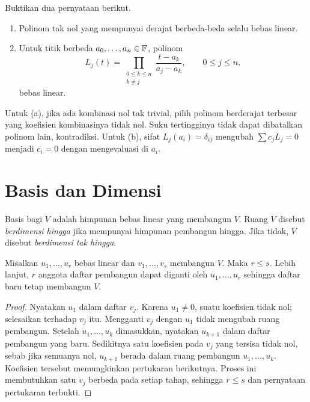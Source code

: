 \begin{exam}
    Buktikan dua pernyataan berikut.
    \begin{enumerate}[label=(\alph*),nosep]
        \item Polinom tak nol yang mempunyai derajat berbeda-beda
        selalu bebas linear.
        \item Untuk titik berbeda $a_0,\ldots,a_n\in\mathbb{F}$, polinom
        \[
            L_j(t)=\prod_{\substack{0\le k\le n\\k\ne j}}
                \frac{t-a_k}{a_j-a_k},\qquad 0\le j\le n,
        \]
        bebas linear.
    \end{enumerate}
\end{exam}
\begin{solution}
    Untuk (a), jika ada kombinasi nol tak trivial, pilih polinom
    berderajat terbesar yang koefisien kombinasinya tidak nol.
    Suku tertingginya tidak dapat dibatalkan polinom lain, kontradiksi.
    Untuk (b), sifat $L_j(a_i)=\delta_{ij}$ mengubah
    $\sum c_jL_j=0$ menjadi $c_i=0$ dengan mengevaluasi di $a_i$.
\end{solution}

\section{Basis dan Dimensi}

\begin{definisi}
    Basis bagi $V$ adalah himpunan bebas linear yang membangun $V$.
    Ruang $V$ disebut \emph{berdimensi hingga} jika mempunyai
    himpunan pembangun hingga. Jika tidak, $V$ disebut
    \emph{berdimensi tak hingga}.
\end{definisi}

\begin{teorema}
    Misalkan $u_1,\ldots,u_r$ bebas linear dan
    $v_1,\ldots,v_s$ membangun $V$. Maka $r\le s$.
    Lebih lanjut, $r$ anggota daftar pembangun dapat diganti
    oleh $u_1,\ldots,u_r$ sehingga daftar baru tetap membangun $V$.
\end{teorema}
\begin{proof}
    Nyatakan $u_1$ dalam daftar $v_j$. Karena $u_1\ne0$, suatu
    koefisien tidak nol; selesaikan terhadap $v_j$ itu. Mengganti
    $v_j$ dengan $u_1$ tidak mengubah ruang pembangun.
    Setelah $u_1,\ldots,u_k$ dimasukkan, nyatakan $u_{k+1}$
    dalam daftar pembangun yang baru. Sedikitnya satu koefisien
    pada $v_j$ yang tersisa tidak nol, sebab jika semuanya nol,
    $u_{k+1}$ berada dalam ruang pembangun $u_1,\ldots,u_k$.
    Koefisien tersebut memungkinkan pertukaran berikutnya.
    Proses ini membutuhkan satu $v_j$ berbeda pada setiap tahap,
    sehingga $r\le s$ dan pernyataan pertukaran terbukti.
\end{proof}

